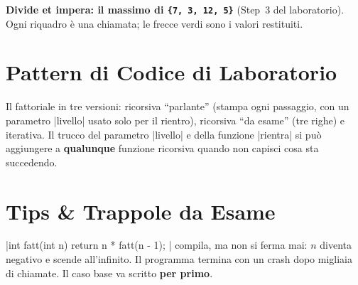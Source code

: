 \needspace{6cm}
\textbf{Divide et impera: il massimo di \texttt{\{7, 3, 12, 5\}}} (Step~3 del
laboratorio). Ogni riquadro è una chiamata; le frecce verdi sono i valori restituiti.
\begin{center}
\end{center}

\section{Pattern di Codice di Laboratorio}

Il fattoriale in tre versioni: ricorsiva ``parlante'' (stampa ogni passaggio, con
un parametro \cc|livello| usato solo per il rientro), ricorsiva ``da esame'' (tre
righe) e iterativa. Il trucco del parametro \cc|livello| e della funzione
\cc|rientra| si può aggiungere a \textbf{qualunque} funzione ricorsiva quando non
capisci cosa sta succedendo.


\section{Tips \& Trappole da Esame}

\begin{trappola}
\cc|int fatt(int n) { return n * fatt(n - 1); }| compila, ma non si ferma mai:
$n$ diventa negativo e scende all'infinito. Il programma termina con un crash dopo
migliaia di chiamate. Il caso base va scritto \textbf{per primo}.
\end{trappola}

